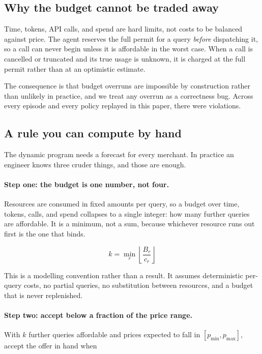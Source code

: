 \subsection{Why the budget cannot be traded away}

Time, tokens, API calls, and spend are hard limits, not costs to be balanced against
price. The agent reserves the full permit for a query \emph{before} dispatching it,
so a call can never begin unless it is affordable in the worst case. When a call is
cancelled or truncated and its true usage is unknown, it is charged at the full
permit rather than at an optimistic estimate.

The consequence is that budget overruns are impossible by construction rather than
unlikely in practice, and we treat any overrun as a correctness bug. Across every
episode and every policy replayed in this paper, there were
\ResultHardBudgetViolations{} violations.

\subsection{A rule you can compute by hand}
\label{sec:rule}

The dynamic program needs a forecast for every merchant. In practice an engineer
knows three cruder things, and those are enough.

\paragraph{Step one: the budget is one number, not four.}
Resources are consumed in fixed amounts per query, so a budget over time, tokens,
calls, and spend collapses to a single integer: how many further queries are
affordable. It is a minimum, not a sum, because whichever resource runs out first
is the one that binds.

\begin{equation}
  k = \min_{r} \left\lfloor \frac{B_r}{c_r} \right\rfloor
  \label{eq:horizon}
\end{equation}

This is a modelling convention rather than a result. It assumes deterministic
per-query costs, no partial queries, no substitution between resources, and a
budget that is never replenished.

\paragraph{Step two: accept below a fraction of the price range.}
With $k$ further queries affordable and prices expected to fall in
$[p_{\min}, p_{\max}]$, accept the offer in hand when

